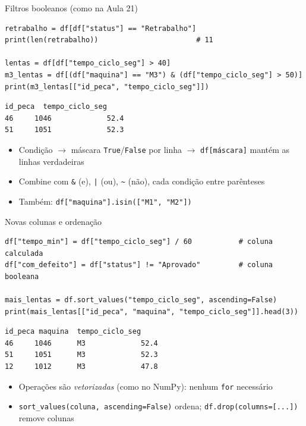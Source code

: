 \documentclass[aspectratio=169,10pt,t]{beamer}
\begin{document}
\begin{frame}[fragile]{Filtros booleanos (como na Aula 21)}
\begin{lstlisting}
retrabalho = df[df["status"] == "Retrabalho"]
print(len(retrabalho))                       # 11

lentas = df[df["tempo_ciclo_seg"] > 40]
m3_lentas = df[(df["maquina"] == "M3") & (df["tempo_ciclo_seg"] > 50)]
print(m3_lentas[["id_peca", "tempo_ciclo_seg"]])
\end{lstlisting}
\begin{lstlisting}[style=saida]
    id_peca  tempo_ciclo_seg
46     1046             52.4
51     1051             52.3
\end{lstlisting}
  \begin{itemize}\small
    \item Condição \(\to\) máscara \texttt{True}/\texttt{False} por linha \(\to\) \texttt{df[máscara]} mantém as linhas verdadeiras
    \item Combine com \texttt{\&} (e), \texttt{|} (ou), \texttt{\textasciitilde} (não), \alert{cada condição entre parênteses}
    \item Também: \texttt{df["maquina"].isin(["M1", "M2"])}
  \end{itemize}
\end{frame}

\begin{frame}[fragile]{Novas colunas e ordenação}
\begin{lstlisting}
df["tempo_min"] = df["tempo_ciclo_seg"] / 60           # coluna calculada
df["com_defeito"] = df["status"] != "Aprovado"         # coluna booleana

mais_lentas = df.sort_values("tempo_ciclo_seg", ascending=False)
print(mais_lentas[["id_peca", "maquina", "tempo_ciclo_seg"]].head(3))
\end{lstlisting}
\begin{lstlisting}[style=saida]
    id_peca maquina  tempo_ciclo_seg
46     1046      M3             52.4
51     1051      M3             52.3
12     1012      M3             47.8
\end{lstlisting}
  \begin{itemize}\small
    \item Operações são \emph{vetorizadas} (como no NumPy): nenhum \texttt{for} necessário
    \item \texttt{sort\_values(coluna, ascending=False)} ordena; \texttt{df.drop(columns=[...])} remove colunas
  \end{itemize}
\end{frame}
\end{document}
